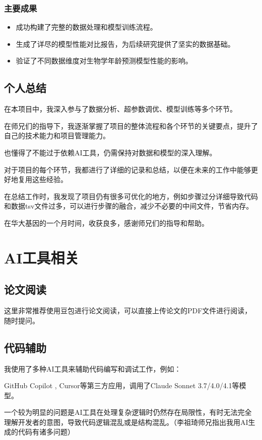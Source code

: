 \documentclass[UTF8]{report}
\theoremstyle{MyLineTheoremStyle} %
\theoremstyle{MyBlockTheoremStyle} %
\theoremstyle{MySubsubsectionStyle} %
\begin{document}
\subsection*{主要成果}
\begin{itemize}
    \item 成功构建了完整的数据处理和模型训练流程。
    \item 生成了详尽的模型性能对比报告，为后续研究提供了坚实的数据基础。
    \item 验证了不同数据维度对生物学年龄预测模型性能的影响。
\end{itemize}

\section{个人总结}
在本项目中，我深入参与了数据分析、超参数调优、模型训练等多个环节。

在师兄们的指导下，我逐渐掌握了项目的整体流程和各个环节的关键要点，提升了自己的技术能力和项目管理能力。

也懂得了不能过于依赖AI工具，仍需保持对数据和模型的深入理解。    

对于项目的每个环节，我都进行了详细的记录和总结，以便在未来的工作中能够更好地复用这些经验。

在总结工作时，我发现了项目仍有很多可优化的地方，例如步骤过分详细导致代码和数据tsv文件过多，可以进行步骤的融合，减少不必要的中间文件，节省内存。

在华大基因的一个月时间，收获良多，感谢师兄们的指导和帮助。


\chapter{AI工具相关}

\section{论文阅读}
这里非常推荐使用豆包进行论文阅读，可以直接上传论文的PDF文件进行阅读，随时提问。

\section{代码辅助}

我使用了多种AI工具来辅助代码编写和调试工作，例如：

GitHub Copilot , Cursor等第三方应用，调用了Claude Sonnet 3.7/4.0/4.1等模型。

一个较为明显的问题是AI工具在处理复杂逻辑时仍然存在局限性，有时无法完全理解开发者的意图，导致代码逻辑混乱或是结构混乱。（李祖琦师兄指出我用AI生成的代码有诸多问题）
\end{document}
